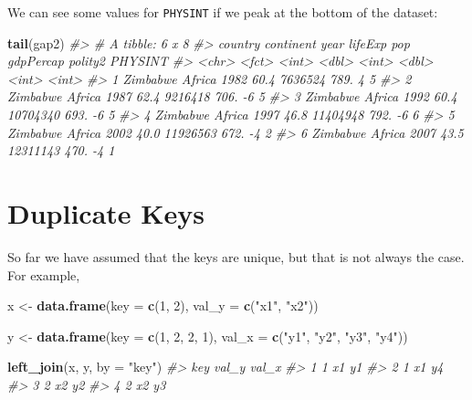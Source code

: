 \documentclass[]{book}
\newenvironment{Shaded}{\begin{snugshade}}{\end{snugshade}}
\newcommand{\KeywordTok}[1]{\textcolor[rgb]{0.13,0.29,0.53}{\textbf{#1}}}
\newcommand{\DataTypeTok}[1]{\textcolor[rgb]{0.13,0.29,0.53}{#1}}
\newcommand{\DecValTok}[1]{\textcolor[rgb]{0.00,0.00,0.81}{#1}}
\newcommand{\StringTok}[1]{\textcolor[rgb]{0.31,0.60,0.02}{#1}}
\newcommand{\CommentTok}[1]{\textcolor[rgb]{0.56,0.35,0.01}{\textit{#1}}}
\newcommand{\NormalTok}[1]{#1}
\begin{document}
We can see some values for \texttt{PHYSINT} if we peak at the bottom of
the dataset:

\begin{Shaded}
\begin{Highlighting}[]
\KeywordTok{tail}\NormalTok{(gap2)}
\CommentTok{#> # A tibble: 6 x 8}
\CommentTok{#>   country  continent  year lifeExp      pop gdpPercap polity2 PHYSINT}
\CommentTok{#>   <chr>    <fct>     <int>   <dbl>    <int>     <dbl>   <int>   <int>}
\CommentTok{#> 1 Zimbabwe Africa     1982    60.4  7636524      789.       4       5}
\CommentTok{#> 2 Zimbabwe Africa     1987    62.4  9216418      706.      -6       5}
\CommentTok{#> 3 Zimbabwe Africa     1992    60.4 10704340      693.      -6       5}
\CommentTok{#> 4 Zimbabwe Africa     1997    46.8 11404948      792.      -6       6}
\CommentTok{#> 5 Zimbabwe Africa     2002    40.0 11926563      672.      -4       2}
\CommentTok{#> 6 Zimbabwe Africa     2007    43.5 12311143      470.      -4       1}
\end{Highlighting}
\end{Shaded}

\section{Duplicate Keys}\label{duplicate-keys}

So far we have assumed that the keys are unique, but that is not always
the case. For example,

\begin{Shaded}
\begin{Highlighting}[]
\NormalTok{x <-}\StringTok{ }\KeywordTok{data.frame}\NormalTok{(}\DataTypeTok{key =} \KeywordTok{c}\NormalTok{(}\DecValTok{1}\NormalTok{, }\DecValTok{2}\NormalTok{),}
               \DataTypeTok{val_y =} \KeywordTok{c}\NormalTok{(}\StringTok{"x1"}\NormalTok{, }\StringTok{"x2"}\NormalTok{))}

\NormalTok{y <-}\StringTok{ }\KeywordTok{data.frame}\NormalTok{(}\DataTypeTok{key =} \KeywordTok{c}\NormalTok{(}\DecValTok{1}\NormalTok{, }\DecValTok{2}\NormalTok{, }\DecValTok{2}\NormalTok{, }\DecValTok{1}\NormalTok{),}
               \DataTypeTok{val_x =} \KeywordTok{c}\NormalTok{(}\StringTok{"y1"}\NormalTok{, }\StringTok{"y2"}\NormalTok{, }\StringTok{"y3"}\NormalTok{, }\StringTok{"y4"}\NormalTok{))}

\KeywordTok{left_join}\NormalTok{(x, y, }\DataTypeTok{by =} \StringTok{"key"}\NormalTok{)}
\CommentTok{#>   key val_y val_x}
\CommentTok{#> 1   1    x1    y1}
\CommentTok{#> 2   1    x1    y4}
\CommentTok{#> 3   2    x2    y2}
\CommentTok{#> 4   2    x2    y3}
\end{Highlighting}
\end{Shaded}
\end{document}
